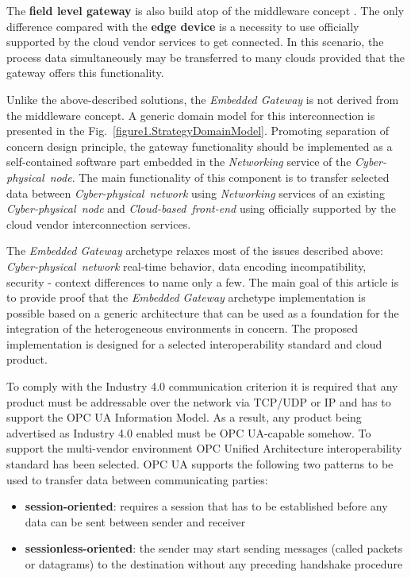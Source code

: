\documentclass[runningheads]{llncs}
\begin{document}
The \textbf{field level gateway} is also build atop of the middleware concept \cite{Sunyaev2020}. The only difference compared with the \textbf{edge device} is a necessity to use officially supported by the cloud vendor services to get connected. In this scenario, the process data simultaneously may be transferred to many clouds provided that the gateway offers this functionality.

Unlike the above-described solutions, the \emph{Embedded Gateway} is not derived from the middleware concept. A generic domain model for this interconnection is presented in the Fig.~\ref{figure1.StrategyDomainModel}. Promoting separation of concern design principle, the gateway functionality should be implemented as a self-contained software part embedded in the \emph{Networking} service of the \emph{Cyber-physical\ node}. The main functionality of this component is to transfer selected data between \emph{Cyber-physical\ network} using \emph{Networking} services of an existing \emph{Cyber-physical\ node} and \emph{Cloud-based\ front-end} using officially supported by the cloud vendor interconnection services.

The \emph{Embedded Gateway} archetype relaxes most of the issues described above: \emph{Cyber-physical\ network} real-time behavior, data encoding incompatibility, security - context differences to name only a few. The main goal of this article is to provide proof that the \emph{Embedded Gateway} archetype implementation is possible based on a generic architecture that can be used as a foundation for the integration of the heterogeneous environments in concern. The proposed implementation is designed for a selected interoperability standard and cloud product.

To comply with the Industry 4.0 communication criterion it is required that any product must be addressable over the network via TCP/UDP or IP and has to support the OPC UA Information Model. As a result, any product being advertised as Industry 4.0 enabled must be OPC UA-capable somehow. To support the multi-vendor environment OPC Unified Architecture interoperability standard has been selected. OPC UA supports the following two patterns to be used to transfer data between communicating parties:

\begin{itemize}
      \item \textbf{session-oriented}: requires a session that has to be established before any data can be sent between sender and receiver
      \item \textbf{sessionless-oriented}: the sender may start sending messages (called packets or datagrams) to the destination without any preceding handshake procedure
\end{itemize}
\end{document}
